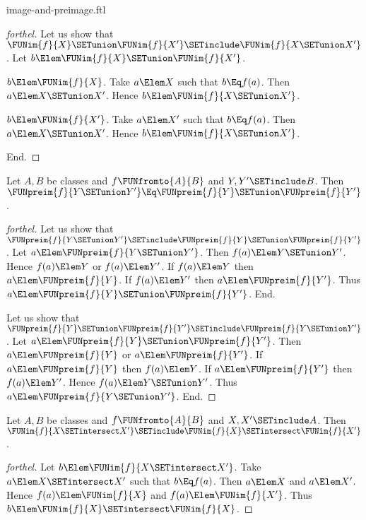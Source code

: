 \documentclass{stex}
\begin{document}
\begin{smodule}{image-and-preimage.ftl}
\begin{proof}[forthel]
  Let us show that $\FUNim{f}{X} \SETunion \FUNim{f}{X'} \SETinclude \FUNim{f}{X \SETunion X'}$.
    Let $b \Elem \FUNim{f}{X} \SETunion \FUNim{f}{X'}$.

    \begin{case}{$b \Elem \FUNim{f}{X}$.}
      Take $a \Elem X$ such that $b \Eq f(a)$.
      Then $a \Elem X \SETunion X'$.
      Hence $b \Elem \FUNim{f}{X \SETunion X'}$.
    \end{case}

    \begin{case}{$b \Elem \FUNim{f}{X'}$.}
      Take $a \Elem X'$ such that $b \Eq f(a)$.
      Then $a \Elem X \SETunion X'$.
      Hence $b \Elem \FUNim{f}{X \SETunion X'}$.
    \end{case}
  End.
\end{proof}

\begin{proposition}[forthel,id=FOUNDATIONS_07_1547089051910144]
  Let $A, B$ be classes and $f \FUNfromto{A}{B}$ and $Y, Y' \SETinclude B$.
  Then $\FUNpreim{f}{Y \SETunion Y'} \Eq \FUNpreim{f}{Y} \SETunion \FUNpreim{f}{Y'}$.
\end{proposition}
\begin{proof}[forthel]
  Let us show that $\FUNpreim{f}{Y \SETunion Y'} \SETinclude \FUNpreim{f}{Y} \SETunion \FUNpreim{f}{Y'}$.
    Let $a \Elem \FUNpreim{f}{Y \SETunion Y'}$.
    Then $f(a) \Elem Y \SETunion Y'$.
    Hence $f(a) \Elem Y$ or $f(a) \Elem Y'$.
    If $f(a) \Elem Y$ then $a \Elem \FUNpreim{f}{Y}$.
    If $f(a) \Elem Y'$ then $a \Elem \FUNpreim{f}{Y'}$.
    Thus $a \Elem \FUNpreim{f}{Y} \SETunion \FUNpreim{f}{Y'}$.
  End.

  Let us show that $\FUNpreim{f}{Y} \SETunion \FUNpreim{f}{Y'} \SETinclude \FUNpreim{f}{Y \SETunion Y'}$.
    Let $a \Elem \FUNpreim{f}{Y} \SETunion \FUNpreim{f}{Y'}$.
    Then $a \Elem \FUNpreim{f}{Y}$ or $a \Elem \FUNpreim{f}{Y'}$.
    If $a \Elem \FUNpreim{f}{Y}$ then $f(a) \Elem Y$.
    If $a \Elem \FUNpreim{f}{Y'}$ then $f(a) \Elem Y'$.
    Hence $f(a) \Elem Y \SETunion Y'$.
    Thus $a \Elem \FUNpreim{f}{Y \SETunion Y'}$.
  End.
\end{proof}

\begin{proposition}[forthel,id=FOUNDATIONS_07_3966130473402368]
  Let $A, B$ be classes and $f \FUNfromto{A}{B}$ and $X, X' \SETinclude A$.
  Then $\FUNim{f}{X \SETintersect X'} \SETinclude \FUNim{f}{X} \SETintersect \FUNim{f}{X'}$.
\end{proposition}
\begin{proof}[forthel]
  Let $b \Elem \FUNim{f}{X \SETintersect X'}$.
  Take $a \Elem X \SETintersect X'$ such that $b \Eq f(a)$.
  Then $a \Elem X$ and $a \Elem X'$.
  Hence $f(a) \Elem \FUNim{f}{X}$ and $f(a) \Elem \FUNim{f}{X'}$.
  Thus $b \Elem \FUNim{f}{X} \SETintersect \FUNim{f}{X}$.
\end{proof}


\end{smodule}
\end{document}
